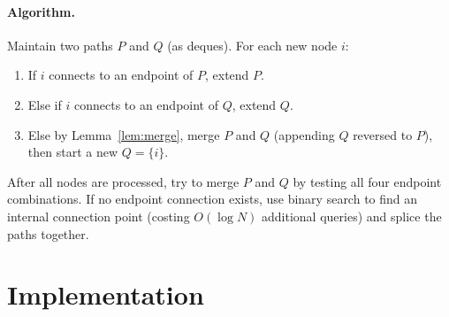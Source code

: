 \documentclass[11pt,a4paper]{article}
\begin{document}
\paragraph{Algorithm.}
Maintain two paths $P$ and $Q$ (as deques).  For each new node $i$:
\begin{enumerate}
  \item If $i$ connects to an endpoint of $P$, extend $P$.
  \item Else if $i$ connects to an endpoint of $Q$, extend $Q$.
  \item Else by Lemma~\ref{lem:merge}, merge $P$ and $Q$ (appending
        $Q$ reversed to $P$), then start a new $Q = \{i\}$.
\end{enumerate}

After all nodes are processed, try to merge $P$ and $Q$ by testing
all four endpoint combinations.  If no endpoint connection exists,
use binary search to find an internal connection point (costing
$O(\log N)$ additional queries) and splice the paths together.

\section{Implementation}
\end{document}
